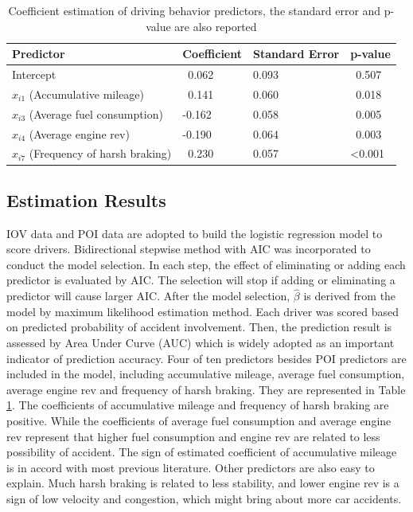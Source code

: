 \documentclass[sii]{ipart}
\theoremstyle{plain}
\begin{document}
 
\begin{table}[h]
 \centering
 \caption{Coefficient estimation of driving behavior predictors, the standard error and p-value are also reported}\label{tab:Result of Model Based on Driving Behavior Data} 
 \vspace{0.5ex}
 \begin{tabular}{llll}
  \toprule[1pt]
  \toprule[1pt]
  Predictor & Coefficient & Standard Error & p-value\\
  \midrule[1pt]
  Intercept & \ 0.062 &  0.093 & \  0.507\\
  $x_{i1}$ (Accumulative mileage) & \ 0.141& 0.060 & \ 0.018\\  
  $x_{i3}$ (Average fuel consumption) & -0.162 & 0.058 & \ 0.005\\
  $x_{i4}$ (Average engine rev) & -0.190 & 0.064 & \ 0.003\\
  $x_{i7}$ (Frequency of harsh braking) & \ 0.230 & 0.057 & \textless0.001\\
  \bottomrule[1pt]  
 \end{tabular}
\end{table}


\subsection{Estimation Results}\label{UBI result}

IOV data and POI data are adopted to build the logistic regression model to score drivers. Bidirectional stepwise method with AIC was incorporated to conduct the model selection. In each step, the effect of eliminating or adding each predictor is evaluated by AIC. The selection will stop if adding or eliminating a predictor will cause larger AIC. After the model selection, $\hat{\beta}$ is derived from the model by maximum likelihood estimation method. Each driver was scored based on predicted probability of accident involvement. Then, the prediction result is assessed by Area Under Curve (AUC) which is widely adopted as an important indicator of prediction accuracy. Four of ten predictors besides POI predictors are included in the model, including accumulative mileage, average fuel consumption, average engine rev and frequency of harsh braking. They are represented in Table \ref{tab:Result of Model Based on Driving Behavior Data}. The coefficients of accumulative mileage and frequency of harsh braking are positive. While the coefficients of average fuel consumption and average engine rev represent that higher fuel consumption and engine rev are related to less possibility of accident. The sign of estimated coefficient of accumulative mileage is in accord with most previous literature. Other predictors are also easy to explain. Much harsh braking is related to less stability, and lower engine rev is a sign of low velocity and congestion, which might bring about more car accidents.
\end{document}
